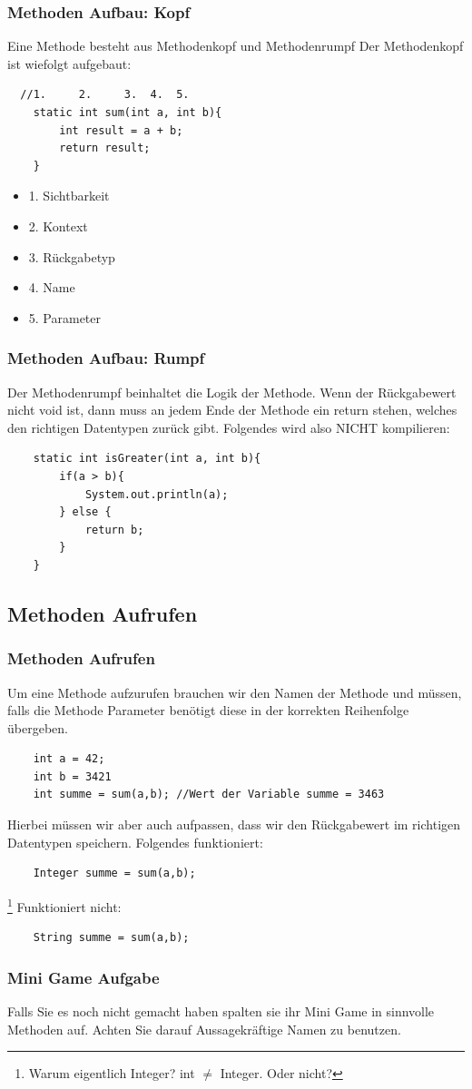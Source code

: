 \begin{frame}[fragile]
\frametitle{Methoden Aufbau: Kopf}
Eine Methode besteht aus Methodenkopf und Methodenrumpf
Der Methodenkopf ist wiefolgt aufgebaut:
\begin{lstlisting}
  //1.     2.     3.  4.  5. 
    static int sum(int a, int b){
        int result = a + b;
        return result;
    }
\end{lstlisting}
\begin{itemize}
    \item 1. Sichtbarkeit
    \item 2. Kontext
    \item 3. Rückgabetyp
    \item 4. Name
    \item 5. Parameter
\end{itemize}
\end{frame}
\begin{frame}[fragile]
\frametitle{Methoden Aufbau: Rumpf}
Der Methodenrumpf beinhaltet die Logik der Methode. Wenn der Rückgabewert nicht void ist, dann muss an jedem Ende der Methode ein return stehen, welches den richtigen Datentypen zurück gibt. Folgendes wird also NICHT kompilieren:
\begin{lstlisting}
    static int isGreater(int a, int b){
        if(a > b){
            System.out.println(a);   
        } else {
            return b;
        }
    }
\end{lstlisting}
\end{frame}

\subsection{Methoden Aufrufen}
\begin{frame}[fragile]
\frametitle{Methoden Aufrufen}
Um eine Methode aufzurufen brauchen wir den Namen der Methode und müssen, falls die Methode Parameter benötigt diese in der korrekten Reihenfolge übergeben.
\begin{lstlisting}
    int a = 42;
    int b = 3421
    int summe = sum(a,b); //Wert der Variable summe = 3463
\end{lstlisting}
Hierbei müssen wir aber auch aufpassen, dass wir den Rückgabewert im richtigen Datentypen speichern. Folgendes funktioniert:
\begin{lstlisting}
    Integer summe = sum(a,b);
\end{lstlisting}\footnote{Warum eigentlich Integer? int $\ne$ Integer. Oder nicht?}
Funktioniert nicht:
\begin{lstlisting}
    String summe = sum(a,b);
\end{lstlisting}
\end{frame}
\begin{frame}[fragile]
\frametitle{Mini Game Aufgabe}
Falls Sie es noch nicht gemacht haben spalten sie ihr Mini Game in sinnvolle Methoden auf. Achten Sie darauf Aussagekräftige Namen zu benutzen. 
\end{frame}

